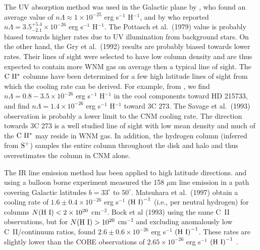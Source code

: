 \documentclass[12pt,preprint,flushrt]{aastex}
\begin{document}
The UV absorption method was used in the Galactic plane 
by \cite{pot79}, 
who found an average value of
$n\Lambda \approx 1 \times 10^{-25}$ erg s$^{-1}$ H$^{-1}$, 
and  by \cite{gry92} who reported $n\Lambda = 3.5^{+5.4}_{-2.1}\times 10^{-26}$
erg s$^{-1}$ H$^{-1}$. The Pottasch et al.\ (1979) value is
probably biased towards higher rates 
due to UV illumination  from background stars. 
On the other hand, the
Gry et al.\ (1992) results are probably biased towards
lower rates.  Their lines of sight were  
selected to have low column density and are thus expected
to contain more WNM gas on average then a typical line of sight.
The ${\rm C~II^*}$ columns have been determined for a few 
high latitude lines of sight from which the cooling rate can be
derived. For example, from \cite{fitz97},
we find $n\Lambda = 0.8-3.5\times 10^{-26}$ erg s$^{-1}$
H$^{-1}$ in the cool components toward HD 215733,
and \cite{sav93} find $n\Lambda = 1.4\times 10^{-26}$
erg s$^{-1}$ H$^{-1}$ toward 3C 273.
The Savage et al.\ (1993) 
observation is probably a lower limit to the CNM cooling rate. 
The direction towards 3C 273  is a well studied line of sight
with low mean density and much of the ${\rm C~II^*}$ may reside
in WNM gas. In addition, the 
hydrogen column (inferred from ${\rm S^+}$) samples the entire column
throughout the disk and halo and thus overestimates the column in 
CNM alone.

The IR line emission method has been applied to high latitude
directions. \cite{bock93} and \cite{mats97}  using a balloon borne experiment
measured the 158 $\mu$m line emission in a path covering Galactic
latitudes $b = 33^\circ$ to $50^\circ$. 
Matsuhara et al.\ (1997) obtain a cooling rate of 
$1.6 \pm 0.4 \times 10^{-26}$ erg s$^{-1}$ ${\rm (H~I)}^{-1}$
(i.e., per neutral hydrogen)
for  columns $N({\rm H~I})< 2\times 10^{20}$ cm$^{-2}$. 
Bock et al (1993) using the same C~II observations, but for
$N({\rm H~I}) > 10^{20}$ cm$^{-2}$  and excluding anomalously low
C~II/continuum ratios, found $2.6 \pm 0.6 \times 10^{-26}$  
erg s$^{-1}$ ${\rm (H~I)}^{-1}$. These rates are slightly lower
than the COBE observations of
$2.65\times 10^{-26}$ erg s$^{-1}$ ${\rm (H~I)}^{-1}$ \citep{benn94}.
\end{document}
